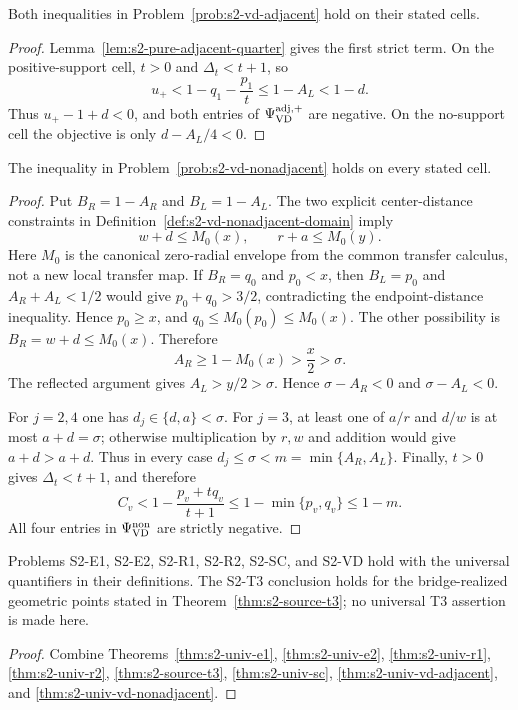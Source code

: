 \begin{theorem}
\label{thm:s2-univ-vd-adjacent}
Both inequalities in Problem~\ref{prob:s2-vd-adjacent} hold on their stated
cells.
\end{theorem}

\begin{proof}
Lemma~\ref{lem:s2-pure-adjacent-quarter} gives the first strict term.  On the
positive-support cell, $t>0$ and
$\Delta_t<t+1$, so
\[
 u_+
 <1-q_1-\frac{p_1}{t}
 \le1-A_L
 <1-d.
\]
Thus $u_+-1+d<0$, and both entries of
$\Psi_{\rm VD}^{\rm adj,+}$ are negative.  On the no-support cell the
objective is only $d-A_L/4<0$.
\end{proof}

\begin{theorem}
\label{thm:s2-univ-vd-nonadjacent}
The inequality in Problem~\ref{prob:s2-vd-nonadjacent} holds on every stated
cell.
\end{theorem}

\begin{proof}
Put $B_R=1-A_R$ and $B_L=1-A_L$.  The two explicit center-distance constraints in
Definition~\ref{def:s2-vd-nonadjacent-domain} imply
\[
 w+d\le M_0(x),
 \qquad
 r+a\le M_0(y).
\]
Here $M_0$ is the canonical zero-radial envelope from the common transfer
calculus, not a new local transfer map.
If $B_R=q_0$ and $p_0<x$, then $B_L=p_0$ and $A_R+A_L<1/2$ would give
$p_0+q_0>3/2$, contradicting the endpoint-distance inequality.  Hence
$p_0\ge x$, and
$q_0\le M_0(p_0)\le M_0(x)$.  The other possibility is
$B_R=w+d\le M_0(x)$.  Therefore
\[
 A_R\ge1-M_0(x)>\frac x2>\sigma.
\]
The reflected argument gives $A_L>y/2>\sigma$.  Hence
$\sigma-A_R<0$ and $\sigma-A_L<0$.

For $j=2,4$ one has $d_j\in\{d,a\}<\sigma$.  For $j=3$, at least one of
$a/r$ and $d/w$ is at most $a+d=\sigma$; otherwise multiplication by
$r,w$ and addition would give $a+d>a+d$.  Thus in every case
$d_j\le\sigma<m=\min\{A_R,A_L\}$.
Finally, $t>0$ gives $\Delta_t<t+1$, and therefore
\[
 C_v
 <1-\frac{p_v+tq_v}{t+1}
 \le1-\min\{p_v,q_v\}
 \le1-m.
\]
All four entries in $\Psi_{\rm VD}^{\rm non}$ are strictly negative.
\end{proof}

\begin{corollary}
\label{cor:s2-source-registry}
Problems S2-E1, S2-E2, S2-R1, S2-R2, S2-SC, and S2-VD hold with the
universal quantifiers in their definitions.  The S2-T3 conclusion holds for
the bridge-realized geometric points stated in
Theorem~\ref{thm:s2-source-t3}; no universal T3 assertion is made here.
\end{corollary}

\begin{proof}
Combine Theorems~\ref{thm:s2-univ-e1}, \ref{thm:s2-univ-e2},
\ref{thm:s2-univ-r1}, \ref{thm:s2-univ-r2},
\ref{thm:s2-source-t3}, \ref{thm:s2-univ-sc},
\ref{thm:s2-univ-vd-adjacent}, and
\ref{thm:s2-univ-vd-nonadjacent}.
\end{proof}
